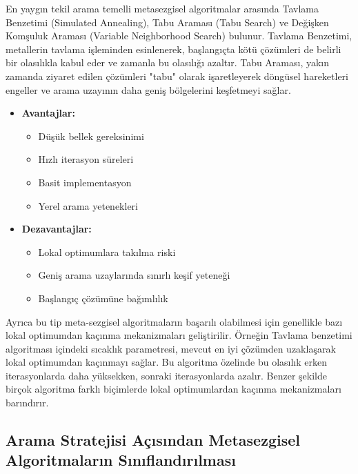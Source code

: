 En yaygın tekil arama temelli metasezgisel algoritmalar arasında Tavlama Benzetimi (Simulated Annealing), Tabu Araması (Tabu Search) ve Değişken Komşuluk Araması (Variable Neighborhood Search) bulunur. Tavlama Benzetimi, metallerin tavlama işleminden esinlenerek, başlangıçta kötü çözümleri de belirli bir olasılıkla kabul eder ve zamanla bu olasılığı azaltır. Tabu Araması, yakın zamanda ziyaret edilen çözümleri "tabu" olarak işaretleyerek döngüsel hareketleri engeller ve arama uzayının daha geniş bölgelerini keşfetmeyi sağlar.

\begin{tcolorbox}[title=Tekil Arama Temelli Algoritmaların Özellikleri]
\begin{itemize}
    \item \textbf{Avantajlar:}
        \begin{itemize}
            \item Düşük bellek gereksinimi
            \item Hızlı iterasyon süreleri
            \item Basit implementasyon
            \item Yerel arama yetenekleri
        \end{itemize}
    \item \textbf{Dezavantajlar:}
        \begin{itemize}
            \item Lokal optimumlara takılma riski
            \item Geniş arama uzaylarında sınırlı keşif yeteneği
            \item Başlangıç çözümüne bağımlılık
        \end{itemize}
\end{itemize}
\end{tcolorbox}

Ayrıca bu tip meta-sezgisel algoritmaların başarılı olabilmesi için genellikle bazı lokal optimumdan kaçınma mekanizmaları geliştirilir. Örneğin Tavlama benzetimi algoritması içindeki sıcaklık parametresi, mevcut en iyi çözümden uzaklaşarak lokal optimumdan kaçınmayı sağlar. Bu algoritma özelinde bu olasılık erken iterasyonlarda daha yüksekken, sonraki iterasyonlarda azalır. Benzer şekilde birçok algoritma farklı biçimlerde lokal optimumlardan kaçınma mekanizmaları barındırır.


\subsection{Arama Stratejisi Açısından Metasezgisel Algoritmaların Sınıflandırılması}

